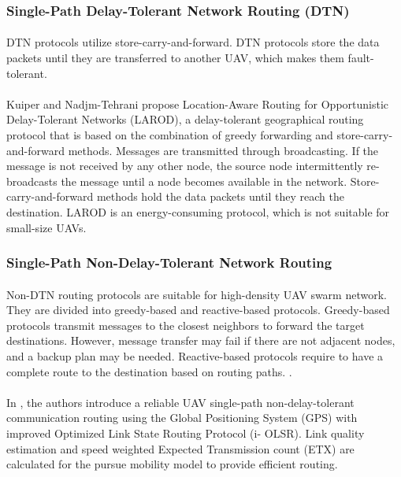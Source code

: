 \documentclass[a4paper,12pt]{report}
\begin{document}
\subsubsection{Single-Path Delay-Tolerant Network Routing (DTN)}
\paragraph{}
DTN protocols utilize store-carry-and-forward. DTN protocols store the data packets until they are transferred to another UAV, which makes them fault-tolerant.

\paragraph{}
Kuiper and Nadjm-Tehrani\cite{5634136} propose Location-Aware Routing for Opportunistic Delay-Tolerant Networks (LAROD), a delay-tolerant geographical routing protocol that is based on the combination of greedy forwarding and store-carry-and-forward methods. Messages are transmitted through broadcasting. If the message is not received by any other node, the source node intermittently re-broadcasts the message until a node becomes available in the network. Store-carry-and-forward methods hold the data packets until they reach the destination. LAROD is an energy-consuming protocol, which is not suitable for small-size UAVs.

\subsubsection{Single-Path Non-Delay-Tolerant Network Routing}
\paragraph{}
Non-DTN routing protocols are suitable for high-density UAV swarm network. They are divided into greedy-based and reactive-based protocols\cite{8772093}. Greedy-based protocols transmit messages to the closest neighbors to forward the target destinations. However, message transfer may fail if there are not adjacent nodes, and a backup plan may be needed\cite{8772093}. Reactive-based protocols require to have a complete route to the destination based on routing paths. .

\paragraph{}
In \cite{8553810}, the authors introduce a reliable UAV single-path non-delay-tolerant communication routing using the Global Positioning System (GPS) with improved Optimized Link State Routing Protocol (i- OLSR). Link quality estimation and speed weighted Expected Transmission count (ETX) are calculated for the pursue mobility model to provide efficient routing.
\end{document}
